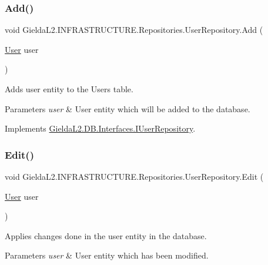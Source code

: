 \subsubsection{\texorpdfstring{Add()}{Add()}}
{\footnotesize\ttfamily void Gielda\+L2.\+I\+N\+F\+R\+A\+S\+T\+R\+U\+C\+T\+U\+R\+E.\+Repositories.\+User\+Repository.\+Add (\begin{DoxyParamCaption}\item[{\mbox{\hyperlink{class_gielda_l2_1_1_d_b_1_1_entities_1_1_user}{User}}}]{user }\end{DoxyParamCaption})}



Adds user entity to the Users table. 


\begin{DoxyParams}{Parameters}
{\em user} & User entity which will be added to the database.\\
\hline
\end{DoxyParams}


Implements \mbox{\hyperlink{interface_gielda_l2_1_1_d_b_1_1_interfaces_1_1_i_user_repository_afd1f24172cd7dd824feb7d1d67ff9475}{Gielda\+L2.\+D\+B.\+Interfaces.\+I\+User\+Repository}}.

\mbox{\label{class_gielda_l2_1_1_i_n_f_r_a_s_t_r_u_c_t_u_r_e_1_1_repositories_1_1_user_repository_a2e07a0a1dd9a6731ed8706b82c66fb49}} 
\subsubsection{\texorpdfstring{Edit()}{Edit()}}
{\footnotesize\ttfamily void Gielda\+L2.\+I\+N\+F\+R\+A\+S\+T\+R\+U\+C\+T\+U\+R\+E.\+Repositories.\+User\+Repository.\+Edit (\begin{DoxyParamCaption}\item[{\mbox{\hyperlink{class_gielda_l2_1_1_d_b_1_1_entities_1_1_user}{User}}}]{user }\end{DoxyParamCaption})}



Applies changes done in the user entity in the database. 


\begin{DoxyParams}{Parameters}
{\em user} & User entity which has been modified.\\
\hline
\end{DoxyParams}



